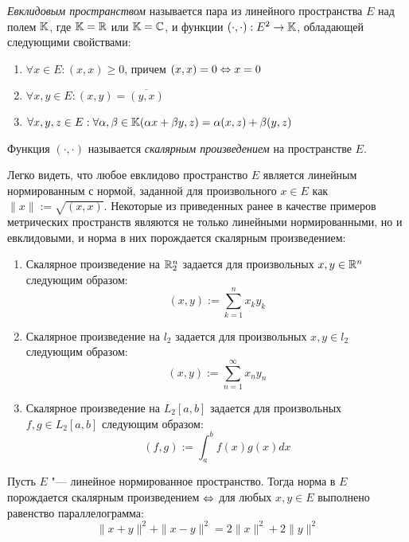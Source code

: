 \begin{definition}
	\textit{Евклидовым пространством} называется пара из линейного пространства $E$ над полем $\mathbb{K}$, где $\mathbb{K} = \mathbb{R}$ или $\mathbb{K} = \mathbb{C}$, и функции $(\cdot, \cdot) : E^2 \to \mathbb{K}$, обладающей следующими свойствами:
	\begin{enumerate}
		\item $\forall x \in E: (x, x) \ge 0$, причем $(x, x) = 0 \Leftrightarrow x = 0$
		\item $\forall x, y \in E: (x, y) = \overline{(y, x)}$
		\item $\forall x, y, z \in E: \forall \alpha, \beta \in \mathbb{K} (\alpha x + \beta y, z) = \alpha(x, z) + \beta(y, z)$
	\end{enumerate}

	Функция $(\cdot, \cdot)$ называется \textit{скалярным произведением} на пространстве $E$.
\end{definition}

\begin{example}
	Легко видеть, что любое евклидово пространство $E$ является линейным нормированным с нормой, заданной для произвольного $x \in E$ как $\|x\| := \sqrt{(x, x)}$. Некоторые из приведенных ранее в качестве примеров метрических пространств являются не только линейными нормированными, но и евклидовыми, и норма в них порождается скалярным произведением:
	\begin{enumerate}
		\item Скалярное произведение на $\mathbb{R}^n_2$ задается для произвольных $x, y \in \mathbb{R}^n$ следующим образом:
  		\[(x, y) := \sum_{k = 1}^n x_ky_k\]

		\item Скалярное произведение на $l_2$ задается для произвольных $x, y \in l_2$ следующим образом:
		\[(x, y) := \sum_{n = 1}^\infty x_ny_n\]

		\item Скалярное произведение на $L_2[a, b]$ задается для произвольных $f, g \in L_2[a, b]$ следующим образом:
		\[(f, g) := \int_a^b f(x)g(x)dx\]
	\end{enumerate}
\end{example}

\begin{theorem}
	Пусть $E$ "--- линейное нормированное пространство. Тогда норма в $E$ порождается скалярным произведением $\Leftrightarrow$ для любых $x, y \in E$ выполнено равенство параллелограмма:
	\[\|x+y\|^2 + \|x-y\|^2 = 2\|x\|^2 + 2\|y\|^2\]
\end{theorem}

